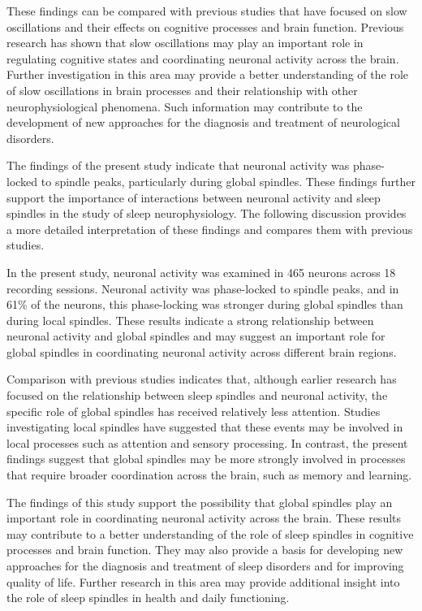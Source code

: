\documentclass[12pt]{report}
\begin{document}
These findings can be compared with previous studies that have focused on slow oscillations and their effects on cognitive processes and brain function. Previous research has shown that slow oscillations may play an important role in regulating cognitive states and coordinating neuronal activity across the brain. Further investigation in this area may provide a better understanding of the role of slow oscillations in brain processes and their relationship with other neurophysiological phenomena. Such information may contribute to the development of new approaches for the diagnosis and treatment of neurological disorders.

The findings of the present study indicate that neuronal activity was phase-locked to spindle peaks, particularly during global spindles. These findings further support the importance of interactions between neuronal activity and sleep spindles in the study of sleep neurophysiology. The following discussion provides a more detailed interpretation of these findings and compares them with previous studies.

In the present study, neuronal activity was examined in 465 neurons across 18 recording sessions. Neuronal activity was phase-locked to spindle peaks, and in 61\% of the neurons, this phase-locking was stronger during global spindles than during local spindles. These results indicate a strong relationship between neuronal activity and global spindles and may suggest an important role for global spindles in coordinating neuronal activity across different brain regions.

Comparison with previous studies indicates that, although earlier research has focused on the relationship between sleep spindles and neuronal activity, the specific role of global spindles has received relatively less attention. Studies investigating local spindles have suggested that these events may be involved in local processes such as attention and sensory processing. In contrast, the present findings suggest that global spindles may be more strongly involved in processes that require broader coordination across the brain, such as memory and learning.

The findings of this study support the possibility that global spindles play an important role in coordinating neuronal activity across the brain. These results may contribute to a better understanding of the role of sleep spindles in cognitive processes and brain function. They may also provide a basis for developing new approaches for the diagnosis and treatment of sleep disorders and for improving quality of life. Further research in this area may provide additional insight into the role of sleep spindles in health and daily functioning.
\end{document}
